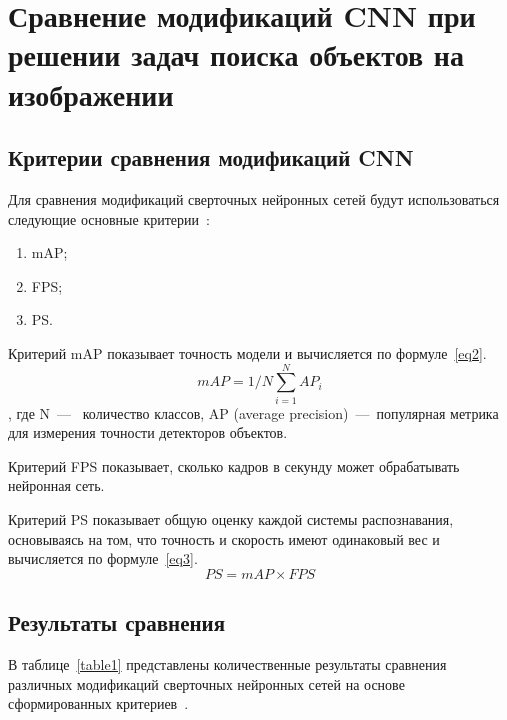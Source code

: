\chapter{Сравнение модификаций CNN при решении задач поиска объектов на изображении}

\section{Критерии сравнения модификаций CNN}

Для сравнения модификаций сверточных нейронных сетей будут использоваться следующие основные критерии~\cite{base, all, yolobase, cmp}:
\begin{enumerate}[leftmargin=1.6\parindent]
	\item mAP;
	\item FPS;
	\item PS.
\end{enumerate}

Критерий mAP показывает точность модели и вычисляется по формуле~\ref{eq2}.
\begin{equation}
	\label{eq2}
	mAP = 1/N \sum_{i=1}^{N} AP_{i}
\end{equation}
, где N~---~ количество классов,
AP (average precision)~---~популярная метрика для измерения точности детекторов объектов.

Критерий FPS показывает, сколько кадров в секунду может обрабатывать нейронная сеть.

Критерий PS показывает общую оценку каждой системы распознавания, основываясь на том, что точность и скорость имеют одинаковый вес и вычисляется по формуле~\ref{eq3}.
\begin{equation}
	\label{eq3}
	PS = mAP \times FPS
\end{equation}

\section{Результаты сравнения}

В таблице~\ref{table1} представлены количественные результаты сравнения различных модификаций сверточных нейронных сетей на основе сформированных критериев~\cite{all, yolobase}.

